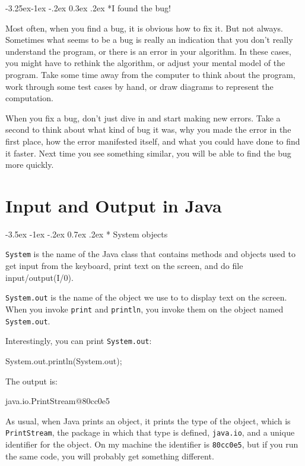 \documentclass{book}
\makeatletter
\newcounter{exercisenum}
\renewcommand{\section}{\@startsection 
    {section} {1} {0mm}%
    {-3.5ex \@plus -1ex \@minus -.2ex}%
    {0.7ex \@plus.2ex}%
    {\normalfont\Large\bfseries}}
\renewcommand\subsection{\@startsection {subsection}{2}{0mm}%
    {-3.25ex\@plus -1ex \@minus -.2ex}%
    {0.3ex \@plus .2ex}%
    {\normalfont\large\bfseries}}
\newcommand{\clearemptydoublepage}{\newpage{\pagestyle{empty}\cleardoublepage}}
\newcommand{\beforechapter}{
    \cleardoublepage 
    \setcounter{exercisenum}{0}
}
\makeatother
\begin{document}
\subsection*{I found the bug!}

Most often, when you find a bug, it is obvious how to fix it.  But not
always.  Sometimes what seems to be a bug is really an indication that
you don't really understand the program, or there is an error in your
algorithm.  In these cases, you might have to rethink the algorithm,
or adjust your mental model of the program.  Take some time away from
the computer to think about the program, work through some test cases
by hand, or draw diagrams to represent the computation.

When you fix a bug, don't just dive in and start making new errors.
Take a second to think about what kind of bug it was, why you made
the error in the first place, how the error manifested itself, and
what you could have done to find it faster.  Next time you see something
similar, you will be able to find the bug more quickly.



\beforechapter
\chapter{Input and Output in Java}
\label{javaio}

\section* {System objects}
\label{system}

{\tt System} is the name of the Java class that contains
methods and objects used to get input from the keyboard,
print text on the screen, and do file input/output(I/0).

{\tt System.out} is the name of the object we use to to display text
on the screen.  When you invoke {\tt print} and {\tt println}, you
invoke them on the object named {\tt System.out}.

Interestingly, you can print {\tt System.out}:

\begin{verbatimtab}
System.out.println(System.out);
\end{verbatimtab}
%
The output is:

\begin{verbatimtab}
java.io.PrintStream@80cc0e5
\end{verbatimtab}
%
As usual, when Java prints an object, it prints the type
of the object, which is {\tt PrintStream}, the package
in which that type is defined, {\tt java.io}, and a
unique identifier for the object.  On my machine the identifier
is {\tt 80cc0e5}, but if you run the same code, you will
probably get something different.
\end{document}

